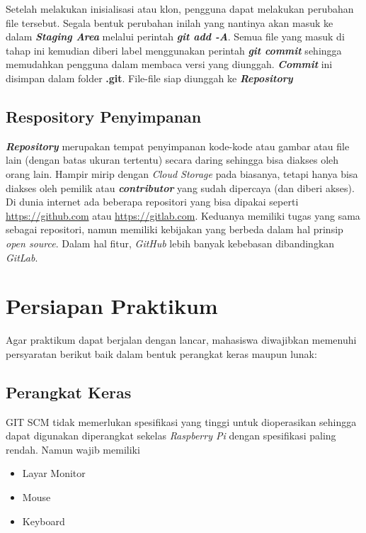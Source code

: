 \documentclass[a4paper, 12pt]{report}
\begin{document}
  Setelah melakukan inisialisasi atau klon, pengguna dapat melakukan perubahan file tersebut. Segala bentuk perubahan inilah yang nantinya akan masuk ke dalam \textbf{\textit{Staging Area}} melalui perintah \textbf{\textit{git add -A}}. Semua file yang masuk di tahap ini kemudian diberi label menggunakan perintah \textbf{\textit{git commit}} sehingga memudahkan pengguna dalam membaca versi yang diunggah. \textbf{\textit{Commit}} ini disimpan dalam folder \textbf{.git}. File-file siap diunggah ke \textbf{\textit{Repository}}
  
  \section{Respository Penyimpanan}
  	
  \textbf{\textit{Repository}} merupakan tempat penyimpanan kode-kode atau gambar atau file lain (dengan batas ukuran tertentu) secara daring sehingga bisa diakses oleh orang lain. Hampir mirip dengan \textit{Cloud Storage} pada biasanya, tetapi hanya bisa diakses oleh pemilik atau \textbf{\textit{contributor}} yang sudah dipercaya (dan diberi akses). Di dunia internet ada beberapa repositori yang bisa dipakai seperti \url{https://github.com} atau \url{https://gitlab.com}. Keduanya memiliki tugas yang sama sebagai repositori, namun memiliki kebijakan yang berbeda dalam hal prinsip \textit{open source}. Dalam hal fitur, \textit{GitHub} lebih banyak kebebasan dibandingkan \textit{GitLab}.
  
  
  \chapter{Persiapan Praktikum}
  
  Agar praktikum dapat berjalan dengan lancar, mahasiswa diwajibkan memenuhi persyaratan berikut baik dalam bentuk perangkat keras maupun lunak:
  
  \section{Perangkat Keras}
  
  GIT SCM tidak memerlukan spesifikasi yang tinggi untuk dioperasikan sehingga dapat digunakan diperangkat sekelas \textit{Raspberry Pi} dengan spesifikasi paling rendah. Namun wajib memiliki
  
  \begin{itemize}
  	\item Layar Monitor
  	\item Mouse
  	\item Keyboard
  \end{itemize}
\end{document}
